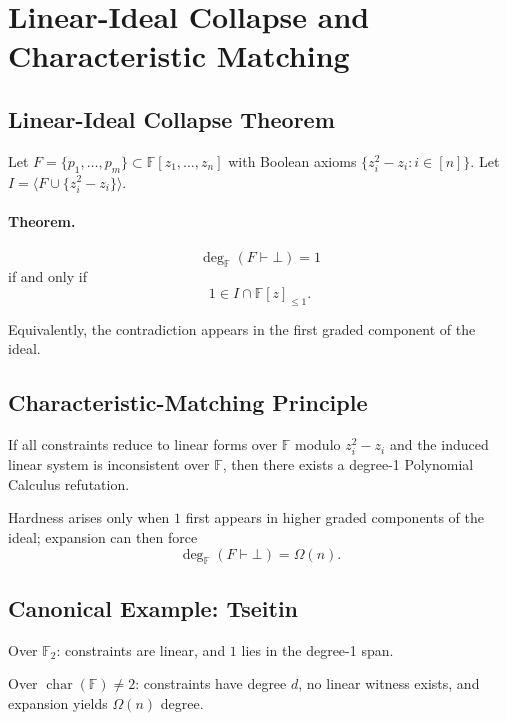 \section{Linear-Ideal Collapse and Characteristic Matching}

\subsection{Linear-Ideal Collapse Theorem}

Let $F = \{p_1,\dots,p_m\} \subset \mathbb F[z_1,\dots,z_n]$ with Boolean axioms
$\{z_i^2 - z_i : i \in [n]\}$.
Let $I = \langle F \cup \{z_i^2 - z_i\}\rangle$.

\paragraph{Theorem.}
\[
\deg_{\mathbb F}(F \vdash \bot) = 1
\]
if and only if
\[
1 \in I \cap \mathbb F[z]_{\le 1}.
\]

Equivalently, the contradiction appears in the first graded component
of the ideal.

\subsection{Characteristic-Matching Principle}

If all constraints reduce to linear forms over $\mathbb F$ modulo
$z_i^2 - z_i$ and the induced linear system is inconsistent over $\mathbb F$,
then there exists a degree-1 Polynomial Calculus refutation.

Hardness arises only when $1$ first appears in higher graded
components of the ideal; expansion can then force
\[
\deg_{\mathbb F}(F \vdash \bot) = \Omega(n).
\]

\subsection{Canonical Example: Tseitin}

Over $\mathbb F_2$: constraints are linear, and $1$ lies in the degree-1 span.

Over $\operatorname{char}(\mathbb F)\neq 2$: constraints have degree $d$,
no linear witness exists, and expansion yields $\Omega(n)$ degree.
